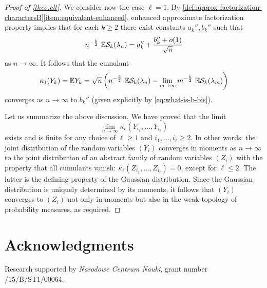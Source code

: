 \documentclass[12pt,usenames,dvipsnames,svgnames,table]{amsart}
\begin{document}
\begin{proof}[Proof of \cref{theo:clt}]
	\bigskip
	
	We consider now the case $\ell=1$. 
	By \cref{def:approx-factorization-charactersB}\ref{item:equivalent-enhanced},
	enhanced approximate factorization property implies that for each $k\geq 2$
	there exist constants
	$a_k'', b_k''$ such
	that
	\[ {n^{- \frac{k}{2}}}\ 
	\E \Sfunct_k(\lambda_n) = a_k'' +
	\frac{b_k''+o(1)}{\sqrt{n}}\]
	as $n\to\infty$.
	It follows that the cumulant
	\[
	\kappa_1(Y_k)=
	\mathbb{E} Y_k
	=
	\sqrt{n} \left({n^{- \frac{k}{2}}}\ \mathbb{E}
	\mathcal{S}_k(\lambda_n) - \lim_{m\to\infty} {m^{- \frac{k}{2}}}\ \mathbb{E} \mathcal{S}_k(\lambda_m) 
	\right) 
	\]
	converges as $n\to\infty$ to $b_k''$  (given explicitly by \eqref{eq:what-is-b-bis}).
	
	
	
	
	\bigskip
	
	
	Let us summarize the above discussion.
	We have proved that the limit
	\[ \lim_{n\to\infty} \kappa_\ell \left( Y_{i_1},\dots, Y_{i_\ell} \right) \]
	exists and is finite for any choice of $\ell \geq 1$ and $i_1,\dots,i_\ell \geq 2$.
	In other words: the joint distribution of the random variables $(Y_i)$
	converges in moments as $n\to\infty$ to the joint distribution of an abstract family of random
	variables $(Z_i)$ with the property that all cumulants vanish: 
	$\kappa_\ell \left( Z_{i_1},\dots, Z_{i_\ell} \right)=0$, except for $\ell\leq 2$.
	The latter is the defining property of the Gaussian distribution.
	Since the Gaussian distribution is uniquely determined by its moments,
	it follows that $(Y_i)$ converges to $(Z_i)$ not only in moments
	but also in the weak topology of probability measures, as required.
\end{proof}

\section*{Acknowledgments}

Research supported by \emph{Narodowe Centrum Nauki}, grant number /15/B/ST1/00064.



\end{document}
